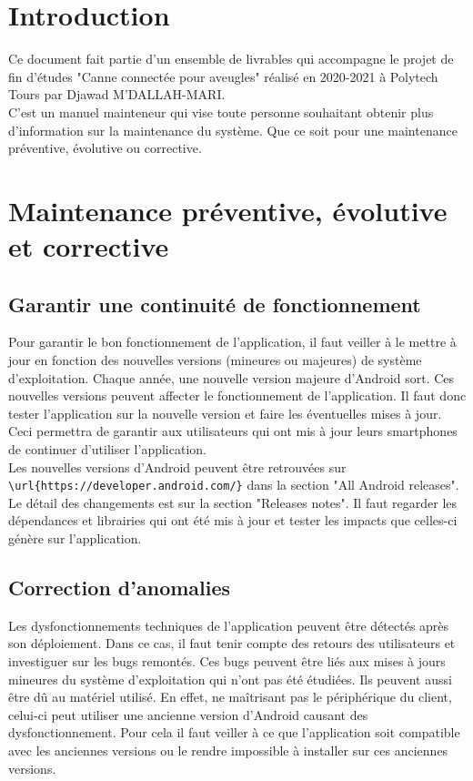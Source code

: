 \documentclass[UTF8]{EPURapport}
\begin{document}
\chapter{Introduction}

Ce document fait partie d'un ensemble de livrables qui accompagne le projet de fin d'études "Canne connectée pour aveugles" réalisé en 2020-2021 à Polytech Tours par Djawad M'DALLAH-MARI.\\

C'est un manuel mainteneur qui vise toute personne souhaitant obtenir plus d'information sur la maintenance du système. Que ce soit pour une maintenance préventive, évolutive ou corrective.

\chapter{Maintenance préventive, évolutive et corrective}
\section{Garantir une continuité de fonctionnement}
Pour garantir le bon fonctionnement de l'application, il faut veiller à le mettre à jour en fonction des nouvelles versions (mineures ou majeures) de système d'exploitation. Chaque année, une nouvelle version majeure d'Android sort. Ces nouvelles versions peuvent affecter le fonctionnement de l'application. Il faut donc tester l'application sur la nouvelle version et faire les éventuelles mises à jour. Ceci permettra de garantir aux utilisateurs qui ont mis à jour leurs smartphones de continuer d'utiliser l'application.\\

Les nouvelles versions d'Android peuvent être retrouvées sur  \verb|\url{https://developer.android.com/}| dans la section "All Android releases". Le détail des changements est sur la section "Releases notes". Il faut regarder les dépendances et librairies qui ont été mis à jour et tester les impacts que celles-ci génère sur l'application.

\section{Correction d'anomalies}
Les dysfonctionnements techniques de l'application peuvent être détectés après son déploiement. Dans ce cas, il faut tenir compte des retours des utilisateurs et investiguer sur les bugs remontés. Ces bugs peuvent être liés aux mises à jours mineures du système d'exploitation qui n'ont pas été étudiées. Ils peuvent aussi être dû au matériel utilisé. En effet, ne maîtrisant pas le périphérique du client, celui-ci peut utiliser une ancienne version d'Android causant des dysfonctionnement. Pour cela il faut veiller à ce que l'application soit compatible avec les anciennes versions ou le rendre impossible à installer sur ces anciennes versions.
\end{document}

